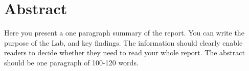\section{Abstract}
{\fontsize{12pt}{14.4pt} \selectfont
\tab Here you present a one paragraph summary of the report. You can write the purpose of the Lab, and key findings. The information should clearly enable readers to decide whether they need to read your whole report. The abstract should be one paragraph of 100-120 words.
}
